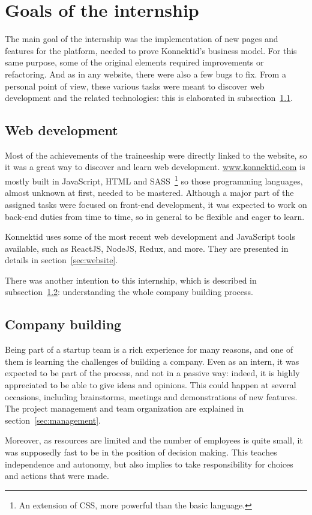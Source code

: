 \section{Goals of the internship}
\label{sec:goals}

The main goal of the internship was the implementation of new pages and features for the platform, needed to prove Konnektid's business model.
For this same purpose, some of the original elements required improvements or refactoring. And as in any website, there were also a few bugs to fix.
From a personal point of view, these various tasks were meant to discover web development and the related technologies: this is elaborated in {\sc subsection}~\ref{ssec:web}.

\subsection{Web development}
\label{ssec:web}

Most of the achievements of the traineeship were directly linked to the website, so it was a great way to discover and learn web development.
\url{www.konnektid.com} is mostly built in JavaScript, HTML and SASS~\footnote{An extension of CSS, more powerful than the basic language.}
so those programming languages, almost unknown at first, needed to be mastered.
Although a major part of the assigned tasks were focused on front-end development,
it was expected to work on back-end duties from time to time, so in general to be flexible and eager to learn.

Konnektid uses some of the most recent web development and JavaScript tools available, such as ReactJS, NodeJS, Redux, and more.
They are presented in details in {\sc section}~\ref{sec:website}.

There was another intention to this internship, which is described in {\sc subsection}~\ref{ssec:companyBuilding}:
understanding the whole company building process.

\subsection{Company building}
\label{ssec:companyBuilding}

Being part of a startup team is a rich experience for many reasons, and one of them is learning the challenges of building a company.
Even as an intern, it was expected to be part of the process, and not in a passive way:
indeed, it is highly appreciated to be able to give ideas and opinions.
This could happen at several occasions, including brainstorms, meetings and demonstrations of new features.
The project management and team organization are explained in {\sc section}~\ref{sec:management}.

Moreover, as resources are limited and the number of employees is quite small, it was supposedly fast to be in the position of decision making.
This teaches independence and autonomy, but also implies to take responsibility for choices and actions that were made.
